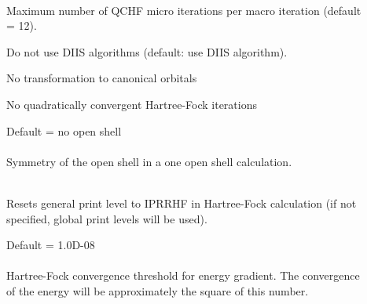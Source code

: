 \begin{description}
\item[]
   \\
  Maximum number of QCHF micro iterations per macro iteration (default = 12).
 
\item[]
  Do not use DIIS algorithms (default: use DIIS algorithm).

\item[]
  No transformation to canonical orbitals
 
\item[]
  No quadratically convergent Hartree-Fock iterations
 
\item[]
  Default = no open shell\\
   \\
  Symmetry of the open shell in a one open shell
  calculation. 
 
\item[]
   \\
  Resets general print level to IPRRHF in Hartree-Fock calculation
  (if not specified, global print levels will be used).
 
\item[]
  Default = 1.0D-08\\
   \\
  Hartree-Fock convergence threshold for energy gradient.  The convergence
  of the energy will be approximately the square of this number.
 
\end{description}
 
 
 
